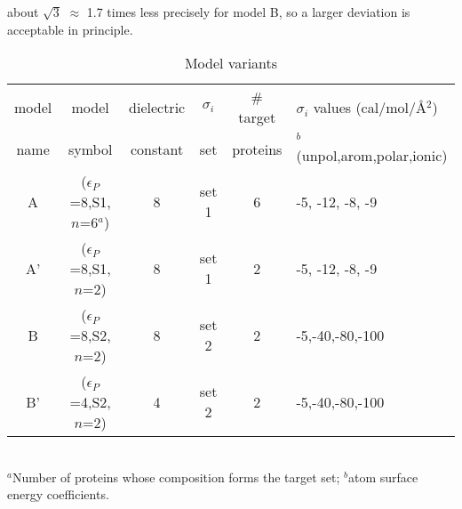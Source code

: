 \documentclass[12pt]{article}
\begin{document}
about $\sqrt{3}$ $\approx$ 1.7 times less precisely for model B, so a larger deviation is acceptable in principle.
\begin{table}[h]                            
\caption{Model variants} \label{tab:models}                      
\begin{center} 
\begin{tabular}{cccccl} \hline \hline  
model & model            & dielectric & $\sigma_i$ & \# target & $\sigma_i$ values (cal/mol/\AA$^2$) \\
name  & symbol           & constant   &  set       & proteins  & $^b$(unpol,arom,polar,ionic) \\ \hline
A     & ($\epsilon_P$=8,S1,$n$=6$^a$) & 8 & set 1      & 6         & -5, -12, -8, -9   \\ 
A'    & ($\epsilon_P$=8,S1,$n$=2) & 8 & set 1      & 2         & -5, -12, -8, -9   \\ 
B     & ($\epsilon_P$=8,S2,$n$=2) & 8 & set 2      & 2         & -5,-40,-80,-100   \\
B'    & ($\epsilon_P$=4,S2,$n$=2) & 4 & set 2      & 2         & -5,-40,-80,-100   \\ \hline
\end{tabular} \\
{\footnotesize $^a$Number of proteins whose composition forms the target set; $^b$atom surface energy coefficients.}
\end{center}
\end{table}
\end{document}
